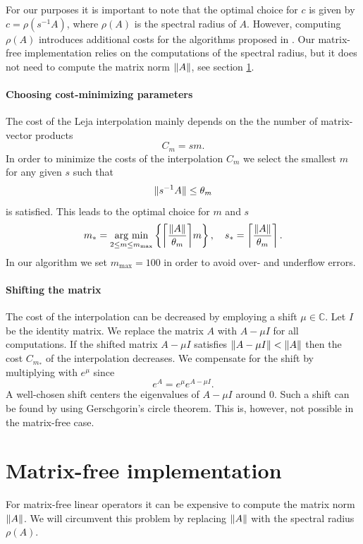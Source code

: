 \documentclass{scrartcl}
\begin{document}
	For our purposes it is important to note that the optimal choice for $c$ is given by $c=\rho(s^{-1}A)$, where $\rho(A)$ is the spectral radius of $A$. However, computing $\rho(A)$ introduces additional costs for the algorithms proposed in \cite{lejarev}. Our matrix-free implementation relies on the computations of the spectral radius, but it does not need to compute the matrix norm $\lVert A\rVert$, see section \ref{matrixfreeimplementation}.
	
	\paragraph{Choosing cost-minimizing parameters}
	The cost of the Leja interpolation mainly depends on the the number of matrix-vector products
	\[
	C_{m} = sm. 
	\]
	In order to minimize the costs of the interpolation $C_m$ we select the smallest $m$ for any given $s$ such that
	\[
	\lVert s^{-1}A\rVert \le \theta_m
	\]
	is satisfied. This leads to the optimal choice for $m$ and $s$ 
	\[
	m_* = \underset{2\le m\le m_{\operatorname{max}}}{\operatorname{arg\ min}}  \left\{{\left\lceil{\frac{\norm{A}}{\theta_m}}\right\rceil}m\right\}, \quad
	s_* =  \left\lceil{\frac{\norm{A}}{\theta_m}}\right\rceil.
	\]
	In our algorithm we set $m_{\operatorname{max}} = 100$ in order to avoid over- and underflow errors.
	
	\paragraph{Shifting the matrix}
	The cost of the interpolation can be decreased by employing a shift $\mu\in\mathbb{C}$. Let $I$ be the identity matrix. We replace the matrix $A$ with $A-\mu I$ for all computations. If the shifted matrix $A-\mu I$ satisfies $\lVert A -\mu I\rVert < \lVert A\rVert$ then the cost $C_{m_*}$ of the interpolation decreases.
	We compensate for the shift by multiplying with $e^\mu$ since
	\[
	e^{A} = e^{\mu}e^{A-\mu I}.
	\]
	A well-chosen shift centers the eigenvalues of $A-\mu I$ around $0$. Such a shift can be found by using Gerschgorin's circle theorem. This is, however, not possible in the matrix-free case.
	
	\section{Matrix-free implementation}\label{matrixfreeimplementation}
	For matrix-free linear operators it can be expensive to compute the matrix norm $\lVert A\rVert$. We will circumvent this problem by replacing $\lVert A\rVert$ with the spectral radius $\rho(A)$. 
	
\end{document}
